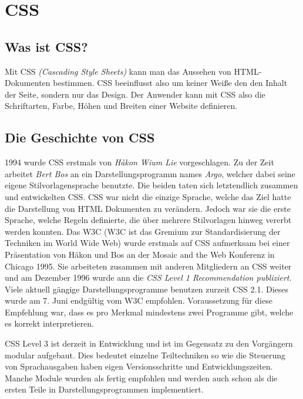 \section{CSS}
\label{css}

\subsection{Was ist CSS?}
Mit CSS \textit{(Cascading Style Sheets)} kann man das Aussehen von HTML-Dokumenten bestimmen. 
CSS beeinflusst also um keiner Weiße den den Inhalt der Seite, sondern nur das Design. Der Anwender 
kann mit CSS also die Schriftarten, Farbe, Höhen und Breiten einer Website definieren.

\subsection{Die Geschichte von CSS}
1994 wurde CSS erstmals von \textit{Håkon Wium Lie} vorgeschlagen. Zu der Zeit arbeitet 
\textit{Bert Bos} an ein Darstellungsprogramm names \textit{Argo}, welcher dabei seine eigene 
Stilvorlagensprache benutzte. Die beiden taten sich letztendlich zusammen und entwickelten CSS. 
CSS war nicht die einzige Sprache, welche das Ziel hatte die Darstellung von HTML Dokumenten zu 
verändern. Jedoch war sie die erste Sprache, welche Regeln definierte, die über mehrere Stilvorlagen 
hinweg vererbt werden konnten. Das W3C (W3C ist das Gremium zur Standardisierung der Techniken im 
World Wide Web) wurde erstmals auf CSS aufmerksam bei einer Präsentation von Håkon und Bos an der 
\glqq Mosaic and the Web\grqq{} Konferenz in Chicago 1995. Sie arbeiteten zusammen mit anderen 
Mitgliedern an CSS weiter und am Dezember 1996 wurde ann die \textit{CSS Level 1 Recommendation 
publiziert}. Viele aktuell gängige Darstellungsprogramme benutzen zurzeit CSS 2.1. Dieses wurde am 
7. Juni endgültig vom W3C empfohlen. Voraussetzung für diese Empfehlung war, dass es 
pro Merkmal mindestens zwei Programme gibt, welche es korrekt interpretieren.


CSS Level 3 ist derzeit in Entwicklung und ist im Gegensatz zu den Vorgängern modular aufgebaut. 
Dies bedeutet einzelne Teiltechniken so wie die Steuerung von Sprachausgaben haben eigen 
Versionsschritte und Entwicklungszeiten. Manche Module wurden als fertig empfohlen und werden auch 
schon als die ersten Teile in Darstellungsprogrammen implementiert.
~\cite{CSS}